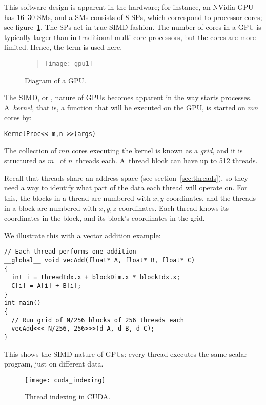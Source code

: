 This software design is apparent in the hardware; for instance, an
NVidia \ac{GPU} has 16--30 \acfp{SM}, and a \acp{SM} consists of 8
\acfp{SP}, which correspond to processor cores; see
figure~\ref{fig:gpu-diagram}. The \acp{SP} act in true SIMD fashion.
The number of cores in a \ac{GPU} is
typically larger than in traditional multi-core processors, but the
cores are more limited. Hence, the term  is used here.

\begin{figure}[ht]
  \begin{quote}
    \texttt{[image: gpu1]}
  \end{quote}
  \caption{Diagram of a GPU.}
  \label{fig:gpu-diagram}
\end{figure}

The \ac{SIMD}, or , nature of \acp{GPU} becomes
apparent in the way  starts
processes. A~\emph{kernel}, that is, a function that will
be executed on the \ac{GPU}, is started on $mn$ cores by:
\begin{verbatim}
KernelProc<< m,n >>(args)
\end{verbatim}
The collection of $mn$ cores executing the kernel is known as a
\emph{grid}, and it is structured as
$m$~ of $n$~threads each. 
A~thread block can have up to 512 threads.

Recall that threads share an address space (see
section~\ref{sec:threads}), so they need a way to identify what part
of the data each thread will operate on. For this, the blocks in a
thread are numbered with $x,y$ coordinates, and the threads in a block
are numbered with $x,y,z$ coordinates. Each thread knows its
coordinates in the block, and its block's coordinates in the grid.

We illustrate this with a vector addition example:
\begin{verbatim}
// Each thread performs one addition
__global__ void vecAdd(float* A, float* B, float* C)
{
  int i = threadIdx.x + blockDim.x * blockIdx.x;
  C[i] = A[i] + B[i];
}
int main()
{
  // Run grid of N/256 blocks of 256 threads each
  vecAdd<<< N/256, 256>>>(d_A, d_B, d_C);
}
\end{verbatim}
This shows the \ac{SIMD} nature of \acp{GPU}: every thread executes
the same scalar program, just on different data.

\begin{figure}[ht]
\texttt{[image: cuda\_indexing]}
\caption{Thread indexing in CUDA.}
\end{figure}

